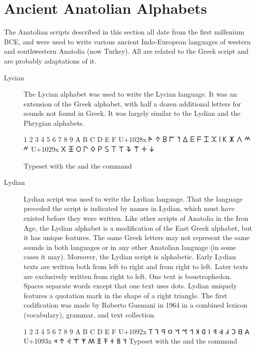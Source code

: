 \section{Ancient Anatolian Alphabets}

The Anatolian scripts described in this section all date from the first millenium BCE, and were used to write various ancient Indo-European languages of western and southwestern Anatolia (now Turkey). All are related to the Greek script and are probably adaptations of it. 

\newfontfamily{}
\let\lydian\lycian
\let\carian\lydian

\begin{description}
\item [Lycian] The Lycian alphabet was used to write the Lycian language. It was an extension of the Greek alphabet, with half a dozen additional letters for sounds not found in Greek. It was largely similar to the Lydian and the Phrygian alphabets.
 
\bgroup
\lydian
{}	1	2	3	4	5	6	7	8	9	A	B	C	D	E	F
U+1028x	𐊀	𐊁	𐊂	𐊃	𐊄	𐊅	𐊆	𐊇	𐊈	𐊉	𐊊	𐊋	𐊌	𐊍	𐊎	𐊏
U+1029x	𐊐	𐊑	𐊒	𐊓	𐊔	𐊕	𐊖	𐊗	𐊘	𐊙	𐊚	𐊛	𐊜

Typeset with the  and the command \cmd{\lydian}
\egroup

\item[Lydian] Lydian script was used to write the Lydian language. That the language preceded the script is indicated by names in Lydian, which must have existed before they were written. Like other scripts of Anatolia in the Iron Age, the Lydian alphabet is a modification of the East Greek alphabet, but it has unique features. The same Greek letters may not represent the same sounds in both languages or in any other Anatolian language (in some cases it may). Moreover, the Lydian script is alphabetic.
Early Lydian texts are written both from left to right and from right to left. Later texts are exclusively written from right to left. One text is boustrophedon. Spaces separate words except that one text uses dots. Lydian uniquely features a quotation mark in the shape of a right triangle.
The first codification was made by Roberto Gusmani in 1964 in a combined lexicon (vocabulary), grammar, and text collection.


\bgroup
\lycian
{}	1	2	3	4	5	6	7	8	9	A	B	C	D	E	F
U+1092x	𐤠	𐤡	𐤢	𐤣	𐤤	𐤥	𐤦	𐤧	𐤨	𐤩	𐤪	𐤫	𐤬	𐤭	𐤮	𐤯
U+1093x	𐤰	𐤱	𐤲	𐤳	𐤴	𐤵	𐤶	𐤷	𐤸	𐤹						𐤿
Typeset with the  and the command \cmd{\lycian}


\end{description}
